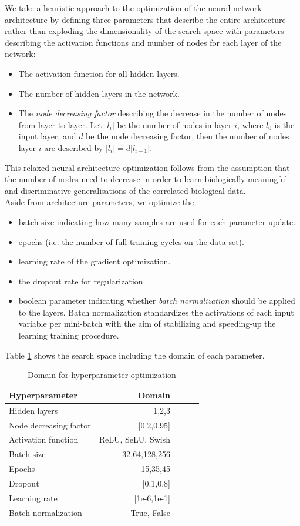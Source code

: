 \documentclass[bsc,frontabs,twoside,singlespacing,parskip,deptreport]{infthesis}     %
\begin{document}
We take a heuristic approach to the optimization of the neural network architecture by defining three parameters that describe the entire architecture rather than exploding the dimensionality of the search space with parameters describing the activation functions and number of nodes for each layer of the network:
\begin{itemize}
    \item The activation function for all hidden layers.
    \item The number of hidden layers in the network.
    \item The \textit{node decreasing factor} describing the decrease in the number of nodes from layer to layer. Let \(|l_i|\) be the number of nodes in layer \(i\), where \(l_0\) is the input layer, and \(d\) be the node decreasing factor, then the number of nodes layer \(i\) are described by \( |l_i| = d|l_{i-1}| \).
\end{itemize}
This relaxed neural architecture optimization follows from the assumption that the number of nodes need to decrease in order to learn biologically meaningful and discriminative generalisations of the correlated biological data. \\
Aside from architecture parameters, we optimize the 
\begin{itemize}
    \item batch size indicating how many samples are used for each parameter update.
    \item epochs (i.e. the number of full training cycles on the data set).
    \item learning rate of the gradient optimization.
    \item the dropout rate for regularization.
    \item boolean parameter indicating whether \textit{batch normalization} should be applied to the layers. Batch normalization standardizes the activations of each input variable per mini-batch with the aim of stabilizing and speeding-up the learning training procedure.\\
\end{itemize}

Table \ref{search_sapce} shows the search space including the domain of each parameter.

\begin{table}[h!]
\centering
\begin{tabular}{lrrrr}
\toprule
{Hyperparameter} &  Domain  \\
\midrule
Hidden layers & {1,2,3} \\
Node decreasing factor & [0.2,0.95] \\
Activation function & {ReLU, SeLU, Swish} \\
Batch size & {32,64,128,256} \\
Epochs & {15,35,45} \\
Dropout & [0.1,0.8] \\
Learning rate & [1e-6,1e-1]  \\
Batch normalization & {True, False} \\
\bottomrule
\end{tabular}
\caption{Domain for hyperparameter optimization}\label{search_sapce}
\end{table}
\end{document}
